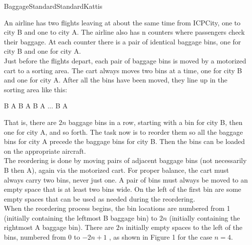 \begin{problema}{Baggage}{Standard}{Standard}{Kattis} 


An airline has two flights leaving at about the same time from ICPCity, one to city B and one to city A. The airline also has n  counters where passengers check their baggage. At each counter there is a pair of identical baggage bins, one for city B and one for city A. \\

Just before the flights depart, each pair of baggage bins is moved by a motorized cart to a sorting area. The cart always moves two bins at a time, one for city B and one for city A. After all the bins have been moved, they line up in the sorting area like this: \\

\begin{center}
B A B A B A ... B A 
\end{center}

That is, there are $2n$  baggage bins in a row, starting with a bin for city B, then one for city A, and so forth. The task now is to reorder them so all the baggage bins for city A precede the baggage bins for city B. Then the bins can be loaded on the appropriate aircraft. \\

The reordering is done by moving pairs of adjacent baggage bins (not necessarily B then A), again via the motorized cart. For proper balance, the cart must always carry two bins, never just one. A pair of bins must always be moved to an empty space that is at least two bins wide. On the left of the first bin are some empty spaces that can be used as needed during the reordering. \\

When the reordering process begins, the bin locations are numbered from 1  (initially containing the leftmost B baggage bin) to $2n$  (initially containing the rightmost A baggage bin). There are $2n$  initially empty spaces to the left of the bins, numbered from 0  to $-2n+1$ , as shown in Figure 1 for the case $n=4$. \\


\end{problema}

